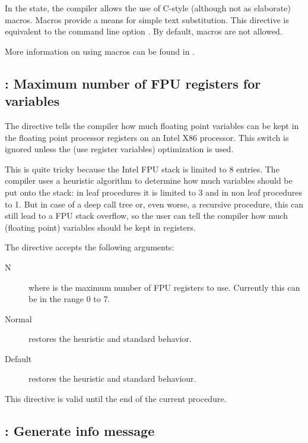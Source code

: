 In the  state, the compiler allows the use of C-style
(although not as elaborate) macros. Macros provide a means for simple text
substitution. This directive is equivalent to the command line option .
By default, macros are not allowed.

More information on using macros can be found in . 


\subsection{ : Maximum number of FPU registers for variables}

The  directive tells the compiler how much floating point
variables can be kept in the floating point processor registers on an Intel
X86 processor. This switch is ignored unless the  (use register variables) 
optimization is used.

This is quite tricky because the Intel FPU stack is limited to 8 entries.
The compiler uses a heuristic algorithm to determine how much variables should be
put onto the stack: in leaf procedures it is limited to 3 and in non leaf
procedures to 1. But in case of a deep call tree or, even worse, a recursive
procedure, this can still lead to a FPU stack overflow, so the user can tell
the compiler how much (floating point) variables should be kept in registers.

The directive accepts the following arguments:

\begin{description}
\item [N] where  is the maximum number of FPU registers to use.
Currently this can be in the range 0 to 7.
\item[Normal] restores the heuristic and standard behavior.
\item[Default] restores the heuristic and standard behaviour.
\end{description}

\begin{remark}This directive is valid until the end of the current procedure.
\end{remark}

\subsection{ : Generate info message}

